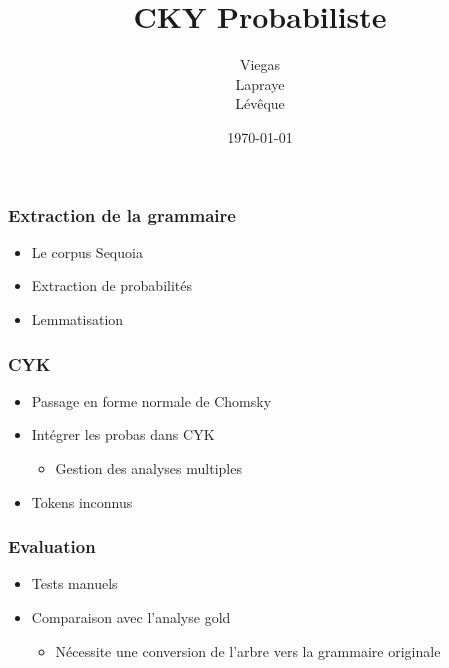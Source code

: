 \documentclass{beamer}
\begin{document}
\title{CKY Probabiliste}  %
\author{Viegas\\Lapraye\\Lévêque}

\date{\today}


\begin{frame}
 \maketitle
\end{frame}




\begin{frame}
\frametitle{Extraction de la grammaire}

\begin{itemize}
 \item<1-3> Le corpus Sequoia
 \item<2-3> Extraction de probabilités
 \item<3-3> Lemmatisation
\end{itemize}

 
\end{frame}

\begin{frame}
 \frametitle{CYK}
 \begin{itemize}
  \item<1-3>{Passage en forme normale de Chomsky}
  \item<2-3>{Intégrer les probas dans CYK}
  \begin{itemize}
   \item<2-3>{Gestion des analyses multiples}
  \end{itemize}
  \item<3>{Tokens inconnus}
 
 \end{itemize}

 
\end{frame}

\begin{frame}
\frametitle{Evaluation}
 \begin{itemize}
  
  \item<1-3>{Tests manuels}
  
  \item<2-3>{Comparaison avec l'analyse gold}
  \begin{itemize}
   \item<3-3>{Nécessite une conversion de l'arbre vers la grammaire originale}
  \end{itemize}

 \end{itemize}

\end{frame}
\end{document}
